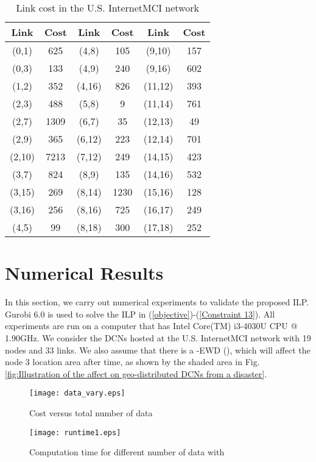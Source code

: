 \documentclass[conference]{IEEEtran}\IEEEoverridecommandlockouts
\begin{document}
\begin{table}[t]
\centering \caption{\label{Link} Link cost in the  U.S. InternetMCI network}
\begin{tabular}{|c|c|c|c|c|c|}
\hline
Link & Cost & Link &Cost  & Link &Cost\\
\hline
(0,1) &625 &(4,8) &105&(9,10) &157\\
\hline
(0,3) &133 &(4,9) &240&(9,16) &602\\
\hline
(1,2) &352 &(4,16) &826&(11,12) &393\\
\hline
(2,3) &488 &(5,8) &9&(11,14) &761\\
\hline
(2,7) &1309 &(6,7) &35&(12,13) &49\\
\hline
(2,9) &365 &(6,12) &223&(12,14) &701\\
\hline
(2,10) &7213&(7,12) &249&(14,15) &423\\
\hline
(3,7) &824&(8,9) &135&(14,16) &532\\
\hline
(3,15) &269&(8,14) &1230&(15,16) &128\\
\hline
(3,16) &256&(8,16) &725&(16,17) &249\\
\hline
(4,5) &99&(8,18) &300&(17,18) &252\\

\hline
\end{tabular}
\end{table}




\section{Numerical Results}\label{Numerical results}
In this section, we carry out  numerical experiments to validate the proposed ILP. Gurobi 6.0 is used to solve the ILP in (\ref{objective})-(\ref{Constraint 13}). All experiments are run on a computer that has Intel Core(TM) i3-4030U CPU @ 1.90GHz. We consider the DCNs hosted at the U.S. InternetMCI network with 19 nodes and 33 links. We also assume that there is a  -EWD (), which will affect the node 3 location area after  time, as shown by the shaded area in Fig. \ref{fig:Illustration of the affect on geo-distributed DCNs from a disaster}.


\begin{figure}[t]
      \centering
      \texttt{[image: data\_vary.eps]}
   \caption{Cost versus total number of data }
   \label{fig:Cost versus total number of data}
  \end{figure}

\begin{figure}[t]
      \centering
      \texttt{[image: runtime1.eps]}
   \caption{Computation time  for different number of data  with }
   \label{fig:Computation time versus total number of data}
  \end{figure}
\end{document}
